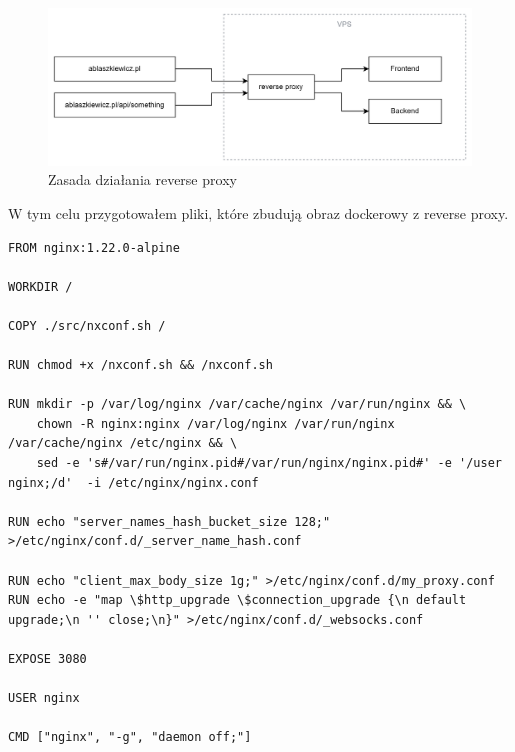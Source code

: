 \documentclass{article}
\begin{document}
\begin{figure}[H]
    \centering
    \includegraphics[width=1\linewidth]{reverseProxyDiagram.png}
    \caption{Zasada działania reverse proxy}
    \label{fig:enter-label}
\end{figure}

W tym celu przygotowałem pliki, które zbudują obraz dockerowy z reverse proxy.

\begin{lstlisting}[caption=Plik \lstinline|/infrastructure/reverse-proxy/Dockerfile|]
FROM nginx:1.22.0-alpine

WORKDIR /

COPY ./src/nxconf.sh /

RUN chmod +x /nxconf.sh && /nxconf.sh

RUN mkdir -p /var/log/nginx /var/cache/nginx /var/run/nginx && \
    chown -R nginx:nginx /var/log/nginx /var/run/nginx /var/cache/nginx /etc/nginx && \
    sed -e 's#/var/run/nginx.pid#/var/run/nginx/nginx.pid#' -e '/user  nginx;/d'  -i /etc/nginx/nginx.conf

RUN echo "server_names_hash_bucket_size 128;" >/etc/nginx/conf.d/_server_name_hash.conf

RUN echo "client_max_body_size 1g;" >/etc/nginx/conf.d/my_proxy.conf
RUN echo -e "map \$http_upgrade \$connection_upgrade {\n default upgrade;\n '' close;\n}" >/etc/nginx/conf.d/_websocks.conf

EXPOSE 3080

USER nginx

CMD ["nginx", "-g", "daemon off;"]
\end{lstlisting}
\end{document}
